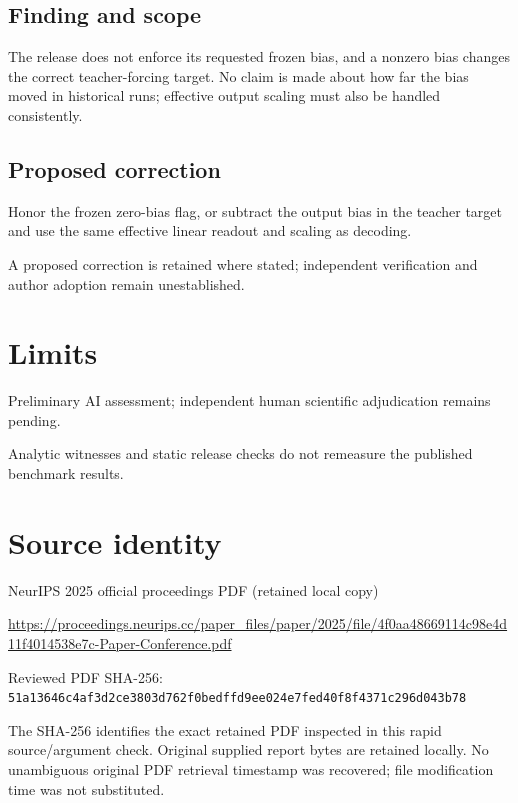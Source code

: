 \documentclass[11pt]{article}
\begin{document}
\subsection*{Finding and scope}

The release does not enforce its requested frozen bias, and a nonzero bias changes the correct teacher-forcing target. No claim is made about how far the bias moved in historical runs; effective output scaling must also be handled consistently.

\subsection*{Proposed correction}

Honor the frozen zero-bias flag, or subtract the output bias in the teacher target and use the same effective linear readout and scaling as decoding.

A proposed correction is retained where stated; independent verification and author adoption remain unestablished.

\section*{Limits}

Preliminary AI assessment; independent human scientific adjudication remains pending.\par

Analytic witnesses and static release checks do not remeasure the published benchmark results.\par

\section*{Source identity}

NeurIPS 2025 official proceedings PDF (retained local copy)

\url{https://proceedings.neurips.cc/paper_files/paper/2025/file/4f0aa48669114c98e4d11f4014538e7c-Paper-Conference.pdf}

Reviewed PDF SHA-256: \nolinkurl{51a13646c4af3d2ce3803d762f0bedffd9ee024e7fed40f8f4371c296d043b78}

The SHA-256 identifies the exact retained PDF inspected in this rapid source/argument check. Original supplied report bytes are retained locally. No unambiguous original PDF retrieval timestamp was recovered; file modification time was not substituted.
\end{document}
